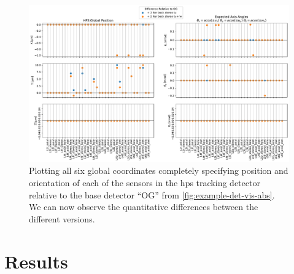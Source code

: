 \begin{figure}
  \centering
  \includegraphics[width=\textwidth]{figures/hps/alignment/example-det-vis-diff.pdf}
  \caption{Plotting all six global coordinates completely specifying position and
    orientation of each of the sensors in the \ac{hps} tracking detector relative to
    the base detector ``OG'' from \cref{fig:example-det-vis-abs}. We can now observe
    the quantitative differences between the different versions.}
  \label{fig:example-det-vis-diff}
\end{figure}

\section{Results}
